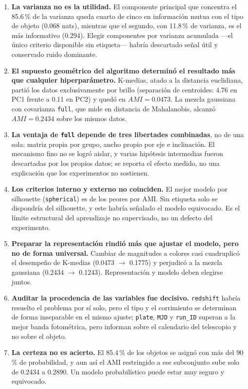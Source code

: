 \documentclass[10pt,journal]{IEEEtran}
\begin{document}
  \begin{enumerate}
    \item \textbf{La varianza no es la utilidad.} El componente principal que concentra el 85.6\,\% de la varianza queda cuarto de cinco en informaci\'on mutua con el tipo de objeto (0.068 nats), mientras que el segundo, con 11.8\,\% de varianza, es el m\'as informativo (0.294). Elegir componentes por varianza acumulada ---el \'unico criterio disponible sin etiqueta--- habr\'ia descartado se\~nal \'util y conservado ruido dominante.
    \item \textbf{El supuesto geom\'etrico del algoritmo determin\'o el resultado m\'as que cualquier hiperpar\'ametro.} K-medias, atado a la distancia euclidiana, parti\'o los datos exclusivamente por brillo (separaci\'on de centroides: 4.76 en PC1 frente a 0.11 en PC2) y qued\'o en $AMI=0.0473$. La mezcla gaussiana con covarianza \texttt{full}, que mide en distancia de Mahalanobis, alcanz\'o $AMI=0.2434$ sobre los mismos datos.
    \item \textbf{La ventaja de \texttt{full} depende de tres libertades combinadas}, no de una sola: matriz propia por grupo, ancho propio por eje e inclinaci\'on. El mecanismo fino no se logr\'o aislar, y varias hip\'otesis intermedias fueron descartadas por los propios datos; se reporta el efecto medido, no una explicaci\'on que los experimentos no sostienen.
    \item \textbf{Los criterios interno y externo no coinciden.} El mejor modelo por silhouette (\texttt{spherical}) es de los peores por AMI. Sin etiqueta solo se dispondr\'ia del silhouette, y este habr\'ia se\~nalado el modelo equivocado. Es el l\'imite estructural del aprendizaje no supervisado, no un defecto del experimento.
    \item \textbf{Preparar la representaci\'on rindi\'o m\'as que ajustar el modelo, pero no de forma universal.} Cambiar de magnitudes a colores casi cuadruplic\'o el desempe\~no de K-medias (0.0473 $\to$ 0.1775) y perjudic\'o a la mezcla gaussiana (0.2434 $\to$ 0.1243). Representaci\'on y modelo deben elegirse juntos.
    \item \textbf{Auditar la procedencia de las variables fue decisivo.} \texttt{redshift} habr\'ia resuelto el problema por s\'i solo, pero el tipo y el corrimiento se determinan de forma inseparable en el mismo ajuste; \texttt{plate}, \texttt{MJD} y \texttt{run\_ID} superan a la mejor banda fotom\'etrica, pero informan sobre el calendario del telescopio y no sobre el objeto.
    \item \textbf{La certeza no es acierto.} El 85.4\,\% de los objetos se asign\'o con m\'as del 90\,\% de probabilidad, y aun as\'i el AMI restringido a ese subconjunto sube solo de 0.2434 a 0.2890. Un modelo probabil\'istico puede estar muy seguro y equivocado.

\end{enumerate}
\end{document}
